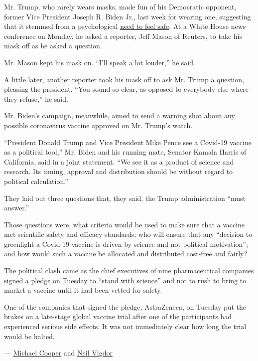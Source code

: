 Mr. Trump, who rarely wears masks, made fun of his Democratic opponent,
former Vice President Joseph R. Biden Jr., last week for wearing one,
suggesting that it stemmed from a psychological
\href{https://www.nytimes3xbfgragh.onion/live/2020/09/03/us/trump-vs-biden\#at-a-latrobe-pa-rally-trump-boasts-of-getting-along-with-russia}{need
to feel safe}. At a White House news conference on Monday, he asked a
reporter, Jeff Mason of Reuters, to take his mask off as he asked a
question.

Mr. Mason kept his mask on. ``I'll speak a lot louder,'' he said.

A little later, another reporter took his mask off to ask Mr. Trump a
question, pleasing the president. ``You sound so clear, as opposed to
everybody else where they refuse,'' he said.

Mr. Biden's campaign, meanwhile, aimed to send a warning shot about any
possible coronavirus vaccine approved on Mr. Trump's watch.

``President Donald Trump and Vice President Mike Pence see a Covid-19
vaccine as a political tool,'' Mr. Biden and his running mate, Senator
Kamala Harris of California, said in a joint statement. ``We see it as a
product of science and research. Its timing, approval and distribution
should be without regard to political calculation.''

They laid out three questions that, they said, the Trump administration
``must answer.''

Those questions were, what criteria would be used to make sure that a
vaccine met scientific safety and efficacy standards; who will ensure
that any ``decision to greenlight a Covid-19 vaccine is driven by
science and not political motivation''; and how would such a vaccine be
allocated and distributed cost-free and fairly?

The political clash came as the chief executives of nine pharmaceutical
companies
\href{https://www.pfizer.com/news/press-release/press-release-detail/biopharma-leaders-unite-stand-science}{signed
a pledge on Tuesday to ``stand with science''} and not to rush to bring
to market a vaccine until it had been vetted for safety.

One of the companies that signed the pledge, AstraZeneca, on Tuesday put
the brakes on a late-stage global vaccine trial after one of the
participants had experienced serious side effects. It was not
immediately clear how long the trial would be halted.

--- \href{https://www.nytimes3xbfgragh.onion/by/michael-cooper}{Michael
Cooper} and
\href{https://www.nytimes3xbfgragh.onion/by/neil-vigdor}{Neil Vigdor}

